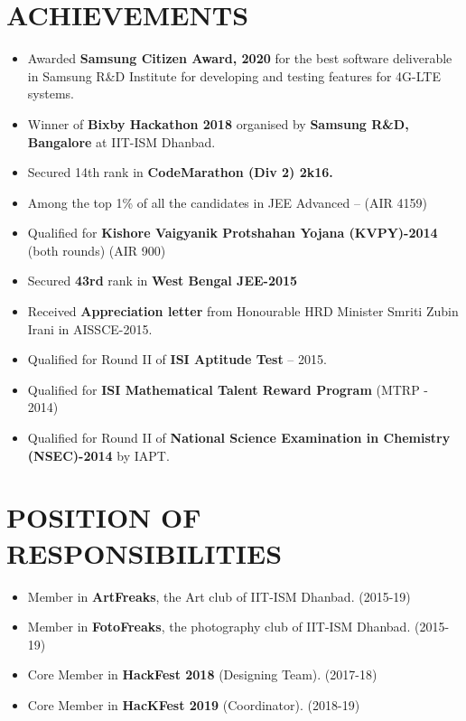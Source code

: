 \documentclass[12pt,a4paper,roman]{moderncv}
\begin{document}
{\section{ACHIEVEMENTS}
\begin{minipage}{\maincolumnwidth}%
	\small{
    	\begin{itemize}
          \item Awarded \textbf{Samsung Citizen Award, 2020} for the best software deliverable in Samsung R\&D Institute for developing and testing features for 4G-LTE systems. 
    \item Winner of \textbf{Bixby Hackathon 2018} organised by \textbf{Samsung R\&D, Bangalore} at IIT-ISM Dhanbad.
    \item Secured 14th rank in \textbf{CodeMarathon (Div 2) 2k16.}
    \item Among the top 1\% of all the candidates in JEE Advanced – (AIR 4159) 
    \item Qualified for \textbf{Kishore Vaigyanik Protshahan Yojana (KVPY)-2014} (both rounds) (AIR  900)
    \item Secured \textbf{43rd} rank in \textbf{West Bengal JEE-2015}
    \item Received \textbf{Appreciation letter} from Honourable HRD Minister Smriti Zubin Irani in AISSCE-2015.
    \item Qualified for Round II of \textbf{ISI Aptitude Test} – 2015.
    \item Qualified for \textbf{ISI Mathematical Talent Reward Program} (MTRP - 2014)
    \item Qualified for Round II of \textbf{National Science Examination in Chemistry (NSEC)-2014} by IAPT.
		\end{itemize}}%
\end{minipage}%


\section{POSITION OF RESPONSIBILITIES}
\begin{minipage}{\maincolumnwidth}%
	\small{
    	\begin{itemize}
    \item Member in \textbf{ArtFreaks}, the Art club of IIT-ISM Dhanbad. (2015-19)
\item Member in  \textbf{FotoFreaks}, the photography club of  IIT-ISM Dhanbad. (2015-19)
\item Core Member in \textbf{HackFest 2018} (Designing Team). (2017-18)
\item Core Member in \textbf{HacKFest 2019} (Coordinator). (2018-19)
		\end{itemize}}%
\end{minipage}%
\fi
}
\end{document}
